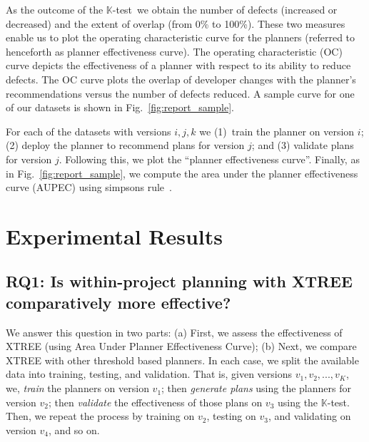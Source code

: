 \documentclass[10pt, journal, compsoc]{IEEEtran}
\newcommand{\ktest}{$\mathbb{K}$-test}
\newcommand{\fig}[1]{Fig.~\ref{fig:#1}}
\begin{document}
As the outcome of the {\ktest}~we obtain the number of defects (increased or decreased) and the extent of overlap (from 0\% to 100\%). These two measures enable us to plot the operating characteristic curve for the planners (referred to henceforth as planner effectiveness curve). The operating characteristic (OC) curve depicts the effectiveness of a planner with respect to its ability to reduce defects. The OC curve plots the overlap of developer changes with the planner's recommendations versus the number of defects reduced. A sample curve for one of our datasets is shown in \fig{report_sample}.

For each of the datasets with versions $i, j, k$ we (1)~train the planner on version $i$; (2) deploy the planner to recommend plans for version $j$; and (3) validate plans for version $j$. Following this, we plot the ``planner effectiveness curve''. Finally, as in \fig{report_sample}, we compute the area under the planner effectiveness curve (AUPEC) using simpsons rule~\cite{Burden:1988}.




 




\section{Experimental Results}
\label{sect:results}
\subsection*{{\bf RQ1: Is within-project planning with XTREE comparatively
more effective?}}

We answer this question in two parts: (a) First, we assess the effectiveness of XTREE (using Area Under Planner Effectiveness Curve); (b) Next, we compare XTREE with other threshold based planners. In each case, we split the available data into training, testing, and validation. That is, given versions $v_1, v_2, ..., v_K$, we, 
{\em train} the planners on version $v_1$; then 
{\em generate plans} using the planners for version $v_2$;
then {\em validate} the effectiveness of those plans on $v_3$ using the \ktest.
Then,  we repeat the process by training on $v_2$, testing on $v_3$, and validating on version $v_4$, and so on.
\end{document}
